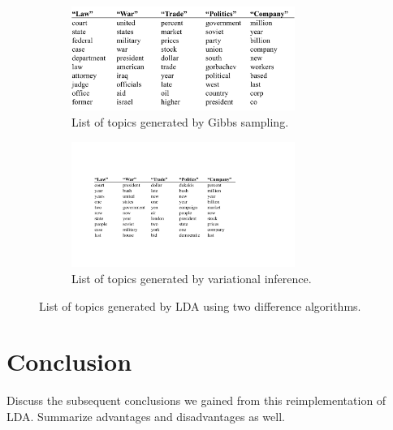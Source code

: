\documentclass{article} %
\begin{document}
\begin{figure}
\begin{subfigure}{1\linewidth}
\centering
\includegraphics[width=0.8\textwidth]{topics_gs}
\caption{List of topics generated by Gibbs sampling.}
\vspace{1em} %
\end{subfigure}

\begin{subfigure}{1\linewidth}
\centering
 \includegraphics[width=0.8\textwidth]{topics_vi}
 \caption{List of topics generated by variational inference.}
\end{subfigure}
\caption{List of topics generated by LDA using two difference algorithms.}
\label{fig:topics_gs}
\end{figure}

\section{Conclusion}
Discuss the subsequent conclusions we gained from this reimplementation of LDA.
Summarize advantages and disadvantages as well.

%
\end{document}
